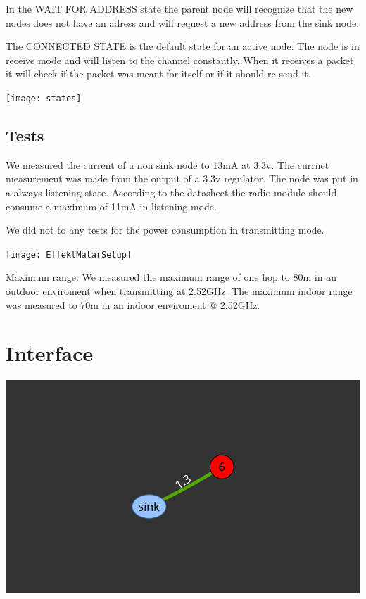 \documentclass[a4paper,11pt]{article}
\begin{document}
In the WAIT FOR ADDRESS state the parent node will recognize that the
new nodes does not have an adress and will request a new address from
the sink node. 

The CONNECTED STATE is the default state for an active node. The node
is in receive mode and will listen to the channel constantly. When
it receives a packet it will check if the packet was meant for
itself or if it should re-send it.

\texttt{[image: states]}


\subsection{Tests}
We measured the current of a non sink node to 13mA at 3.3v. The
currnet measurement was made from the output of a 3.3v regulator. 
The node was put in a always listening state. According to the 
datasheet the radio module should consume a maximum of 11mA in
listening mode.

We did not to any tests for the power consumption in transmitting
mode.


\begin{center}
\texttt{[image: EffektMätarSetup]}
\end{center}

Maximum range:
We measured the maximum range of one hop to 80m in an outdoor 
enviroment when transmitting at 2.52GHz. 
The maximum indoor range was measured to 70m in an indoor
enviroment @ 2.52GHz.
 

\section{Interface}
\begin{center}
\includegraphics[width=.5\textwidth]{map}
\end{center}
\end{document}
